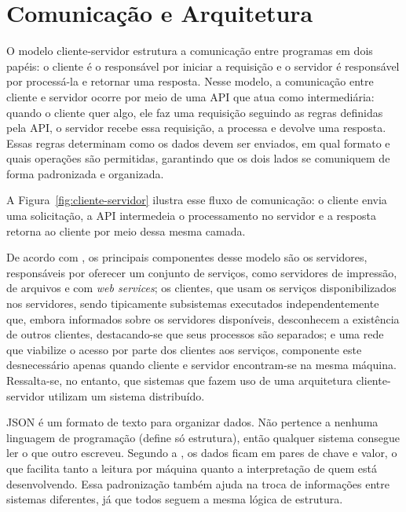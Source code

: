 \documentclass[
    12pt
    ,oneside
    ,a4paper
    ,chapter=TITLE
    ,section=TITLE
    ,sumario=abnt-6027-2012]{abntex2}
\begin{document}
\chapter{Comunicação e Arquitetura}
\label{cap:archteture}

O modelo cliente-servidor estrutura a comunicação entre programas em dois papéis: o cliente é o responsável por iniciar a requisição e o servidor é responsável por processá-la e retornar uma resposta. Nesse modelo, a comunicação entre cliente e servidor ocorre por meio de uma API que atua como intermediária: quando o cliente quer algo, ele faz uma requisição seguindo as regras definidas pela API, o servidor recebe essa requisição, a processa e devolve uma resposta. Essas regras determinam como os dados devem ser enviados, em qual formato e quais operações são permitidas, garantindo que os dois lados se comuniquem de forma padronizada e organizada.

A Figura~\ref{fig:cliente-servidor} ilustra esse fluxo de comunicação: o cliente envia uma solicitação, a API intermedeia o processamento no servidor e a resposta retorna ao cliente por meio dessa mesma camada.

\begin{figure}[H]
\end{figure}

De acordo com , os principais componentes desse modelo são os servidores, responsáveis por oferecer um conjunto de serviços, como servidores de impressão, de arquivos e com \textit{web services}; os clientes, que usam os serviços disponibilizados nos servidores, sendo tipicamente subsistemas executados independentemente que, embora informados sobre os servidores disponíveis, desconhecem a existência de outros clientes, destacando-se que seus processos são separados; e uma rede que viabilize o acesso por parte dos clientes aos serviços, componente este desnecessário apenas quando cliente e servidor encontram-se na mesma máquina. Ressalta-se, no entanto, que sistemas que fazem uso de uma arquitetura cliente-servidor utilizam um sistema distribuído.
    
JSON é um formato de texto para organizar dados. Não pertence a nenhuma linguagem de programação (define só estrutura), então qualquer sistema consegue ler o que outro escreveu. Segundo a , os dados ficam em pares de chave e valor, o que facilita tanto a leitura por máquina quanto a interpretação de quem está desenvolvendo. Essa padronização também ajuda na troca de informações entre sistemas diferentes, já que todos seguem a mesma lógica de estrutura.
\end{document}
